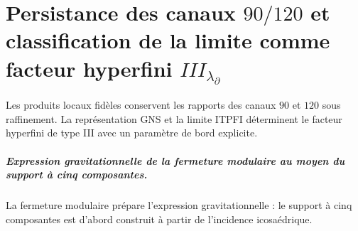 \chapter{Persistance des canaux \texorpdfstring{\(90/120\)}{90/120} et classification de la limite comme facteur hyperfini \texorpdfstring{\(III_{\lambda_\partial}\)}{III(lambda partiel)}}
\label{chap:parte-iv-62}

Les produits locaux fidèles conservent les rapports des canaux \(90\) et \(120\) sous raffinement. La représentation GNS et la limite ITPFI déterminent le facteur hyperfini de type III avec un paramètre de bord explicite.



\paragraph{Expression gravitationnelle de la fermeture modulaire au moyen du support à cinq composantes.} La fermeture modulaire prépare l’expression gravitationnelle : le support à cinq composantes est d’abord construit à partir de l’incidence icosaédrique.
